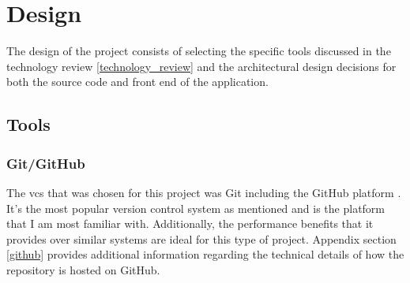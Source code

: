 \documentclass[11pt]{article}
\begin{document}
\clearpage
\section{Design} \label{design} 
The design of the project consists of selecting the specific tools discussed in
the technology review \ref{technology_review} and the architectural design
decisions for both the source code and front end of the application.

\subsection{Tools}
\subsubsection{Git/GitHub} \label{project_management}

The \gls*{vcs} that was chosen for this project was Git including the GitHub
platform \cite{gitvcs}. It's the most popular version control system as
mentioned and is the platform that I am most familiar with. Additionally, the
performance benefits that it provides over similar systems are ideal for this
type of project. Appendix section \ref{github} provides additional information
regarding the technical details of how the repository is hosted on GitHub.
\end{document}
